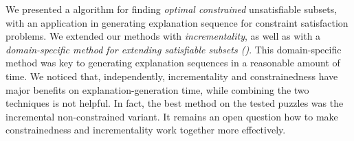 We presented a \hitsetbased algorithm for finding \textit{optimal constrained} unsatisfiable subsets, with an application in generating explanation sequence for constraint satisfaction problems.
We extended our methods with \emph{incrementality}, as well as with a \emph{domain-specific method for extending satisfiable subsets (\grow)}. 
This domain-specific \grow method was key to generating explanation sequences in a reasonable amount of time.
We noticed that, independently, incrementality and constrainedness have major benefits on explanation-generation time, while combining the two techniques is not helpful. In fact, the best method on the tested puzzles was the incremental non-constrained variant. 
It remains an open question how to make constrainedness and incrementality work together more effectively.





